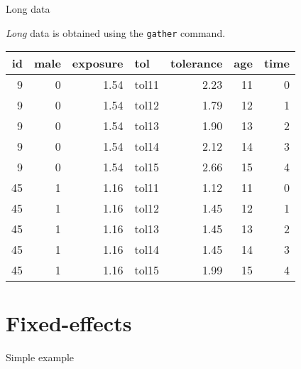 \documentclass[10pt,ignorenonframetext,]{beamer}
\newenvironment{Shaded}{\begin{snugshade}}{\end{snugshade}}
\newcommand{\KeywordTok}[1]{\textcolor[rgb]{0.13,0.29,0.53}{\textbf{{#1}}}}
\newcommand{\DataTypeTok}[1]{\textcolor[rgb]{0.13,0.29,0.53}{{#1}}}
\newcommand{\DecValTok}[1]{\textcolor[rgb]{0.00,0.00,0.81}{{#1}}}
\newcommand{\StringTok}[1]{\textcolor[rgb]{0.31,0.60,0.02}{{#1}}}
\newcommand{\NormalTok}[1]{{#1}}
\begin{document}
\begin{frame}[fragile]{Long data}

\emph{Long} data is obtained using the \texttt{gather} command.
\footnotesize

\begin{Shaded}
\end{Shaded}

\begin{longtable}[]{@{}rrrlrrr@{}}
\toprule
id & male & exposure & tol & tolerance & age & time\tabularnewline
\midrule
\endhead
9 & 0 & 1.54 & tol11 & 2.23 & 11 & 0\tabularnewline
9 & 0 & 1.54 & tol12 & 1.79 & 12 & 1\tabularnewline
9 & 0 & 1.54 & tol13 & 1.90 & 13 & 2\tabularnewline
9 & 0 & 1.54 & tol14 & 2.12 & 14 & 3\tabularnewline
9 & 0 & 1.54 & tol15 & 2.66 & 15 & 4\tabularnewline
45 & 1 & 1.16 & tol11 & 1.12 & 11 & 0\tabularnewline
45 & 1 & 1.16 & tol12 & 1.45 & 12 & 1\tabularnewline
45 & 1 & 1.16 & tol13 & 1.45 & 13 & 2\tabularnewline
45 & 1 & 1.16 & tol14 & 1.45 & 14 & 3\tabularnewline
45 & 1 & 1.16 & tol15 & 1.99 & 15 & 4\tabularnewline
\bottomrule
\end{longtable}

\end{frame}

\section{Fixed-effects}\label{fixed-effects}

Simple example
\end{document}
